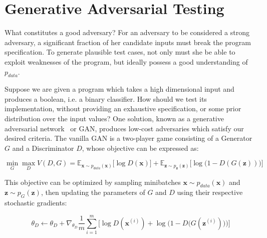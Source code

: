 \documentclass[12pt,initial,twoside,maitrise]{dms}
\numberwithin{equation}{section}
\numberwithin{table}{chapter}
\numberwithin{figure}{chapter}
\begin{document}

\section{Generative Adversarial Testing}

What constitutes a good adversary? For an adversary to be considered a strong adversary, a significant fraction of her candidate inputs must break the program specification. To generate plausible test cases, not only must she be able to exploit weaknesses of the program, but ideally possess a good understanding of $p_{data}$.

Suppose we are given a program which takes a high dimensional input and produces a boolean, i.e. a binary classifier. How should we test its implementation, without providing an exhaustive specification, or some prior distribution over the input values? One solution, known as a generative adversarial network~\citep{goodfellow2014gan} or GAN, produces low-cost adversaries which satisfy our desired criteria. The vanilla GAN is a two-player game consisting of a Generator $G$ and a Discriminator $D$, whose objective can be expressed as:

\begin{equation}
\min_G \max_D V(D, G) = \mathbb{E}_{\mathbf x \sim p_{data}(\mathbf x)}\big[\log D(\mathbf x)\big] + \mathbb{E}_{\mathbf z \sim p_{\mathbf z}(\mathbf z)}\big[\log\big(1 - D(G(\mathbf z))\big)\big]
\end{equation}

This objective can be optimized by sampling minibatches $\mathbf x \sim p_{data}(\mathbf x)$ and $\mathbf z \sim p_{G}(\mathbf z)$, then updating the parameters of $G$ and $D$ using their respective stochastic gradients:

\begin{equation}
\theta_D \leftarrow \theta_D + \nabla_{\theta_D}\frac{1}{m}\sum_{i=1}^m\Big[\log D(\mathbf x^{(i)}) + \log\Big(1 - D\big(G(\mathbf z^{(i)})\big)\Big)\Big]
\end{equation}
\end{document}
